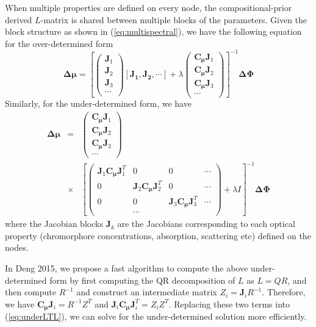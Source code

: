 \documentclass[12pt]{book}               %
\begin{document}
When multiple properties are defined on every node, the compositional-prior derived $L$-matrix is shared between multiple blocks of the parameters. Given the block structure as shown in (\ref{eq:multispectral}), we have the following equation for the over-determined form
\begin{equation}
\mathbf{\Delta\mu}=
\left[\left(\begin{array}{l}
\mathbf{J}_1\\
\mathbf{J}_2\\
\mathbf{J}_3\\
\cdots 
\end{array}\right)
[\mathbf{J_1, J_2},\cdots]+\lambda
\left(\begin{array}{l}
\mathbf{C_\mu}\mathbf{J}_1\\
\mathbf{C_\mu}\mathbf{J}_2\\
\mathbf{C_\mu}\mathbf{J}_3\\
\cdots 
\end{array}\right)\right]^{-1}\mathbf{\Delta\Phi}
\end{equation}
Similarly, for the under-determined form, we have
\begin{eqnarray}\label{eq:underLTL}
\mathbf{\Delta\mu}&=&
\left(\begin{array}{l}
\mathbf{C_\mu}\mathbf{J}_1\\
\mathbf{C_\mu}\mathbf{J}_2\\
\mathbf{C_\mu}\mathbf{J}_3\\
\cdots 
\end{array}\right)\\\nonumber
&\times& \left[
\left(\begin{array}{cccc}
\mathbf{J}_1\mathbf{C_\mu}\mathbf{J}^T_1 & 0 & 0 & \cdots\\
0& \mathbf{J}_2\mathbf{C_\mu}\mathbf{J}^T_2 & 0 & \cdots\\
0 & 0 & \mathbf{J}_3\mathbf{C_\mu}\mathbf{J}^T_3 & \cdots\\
& \cdots& 
\end{array}\right)
+\lambda I\right]^{-1}\mathbf{\Delta\Phi}
\end{eqnarray}
where the Jacobian blocks $\mathbf{J}_k$ are the Jacobians corresponding to each optical property (chromorphore concentrations, absorption, scattering etc) defined on the nodes.

In Deng 2015, we propose a fast algorithm to compute the above under-determined form by first computing the QR decomposition of $L$ as $L=QR$, and then compute $R^{-1}$ and construct an intermediate matrix $Z_i=\mathbf{J}_iR^{-1}$. Therefore, we have $\mathbf{C_\mu}\mathbf{J}_i=R^{-1}Z^T$ and $\mathbf{J}_i\mathbf{C_\mu}\mathbf{J}^T_i=Z_iZ^T$. 
Replacing these two terms into (\ref{eq:underLTL}), we can solve for the under-determined solution more efficiently.
\end{document}
